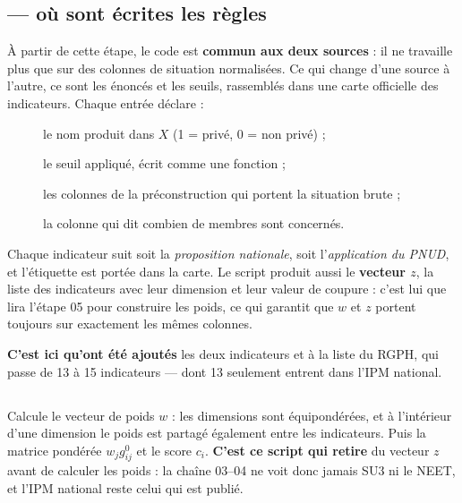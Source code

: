 \documentclass[11pt,a4paper]{article}
\begin{document}
\subsection{ --- où sont écrites les règles}

À partir de cette étape, le code est \textbf{commun aux deux sources} : il ne travaille plus que
sur des colonnes de situation normalisées. Ce qui change d'une source à l'autre, ce sont les
énoncés et les seuils, rassemblés dans une carte officielle des indicateurs. Chaque entrée
déclare :

\begin{description}
  \item[] le nom produit dans $X$ (1 = privé, 0 = non privé) ;
  \item[] le seuil appliqué, écrit comme une fonction ;
  \item[] les colonnes de la préconstruction qui portent la situation brute ;
  \item[] la colonne qui dit combien de membres sont concernés.
\end{description}

Chaque indicateur suit soit la \emph{proposition nationale}, soit l'\emph{application du PNUD},
et l'étiquette est portée dans la carte. Le script produit aussi le \textbf{vecteur $z$}, la
liste des indicateurs avec leur dimension et leur valeur de coupure : c'est lui que lira
l'étape 05 pour construire les poids, ce qui garantit que $w$ et $z$ portent toujours sur
exactement les mêmes colonnes.

\textbf{C'est ici qu'ont été ajoutés} les deux indicateurs  et
 à la liste du RGPH, qui passe de 13 à 15 indicateurs --- dont 13 seulement
entrent dans l'IPM national.

\subsection{}

Calcule le vecteur de poids $w$ : les dimensions sont équipondérées, et à l'intérieur d'une
dimension le poids est partagé également entre les indicateurs. Puis la matrice pondérée
$w_j g^0_{ij}$ et le score $c_i$. \textbf{C'est ce script qui retire }
du vecteur $z$ avant de calculer les poids : la chaîne 03--04 ne voit donc jamais SU3 ni le NEET,
et l'IPM national reste celui qui est publié.
\end{document}
